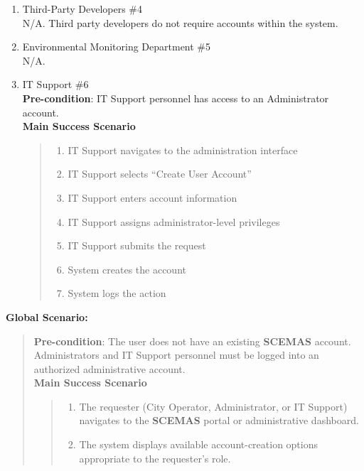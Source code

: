 \documentclass[]{article}
\begin{document}
\begin{enumerate}[{\bf BE9.}]
\begin{enumerate}[{\bf VP1.}]
			\item Third-Party Developers \#4\\
                N/A. Third party developers do not require accounts within the system.

			\item Environmental Monitoring Department \#5\\
                N/A.

			\item IT Support \#6\\
                \textbf{Pre-condition}: IT Support personnel has access to an Administrator account. \\
                \textbf{Main Success Scenario}
                \begin{quote}
                    \begin{enumerate}[1.]
                        \item IT Support navigates to the administration interface
                        \item IT Support selects ``Create User Account''
                        \item IT Support enters account information
                        \item IT Support assigns administrator-level privileges
                        \item IT Support submits the request
                        \item System creates the account
                        \item System logs the action
                    \end{enumerate}
                \end{quote}
		\end{enumerate}
    {\bf Global Scenario:}
        \begin{quote}
            \textbf{Pre-condition}: The user does not have an existing \textbf{SCEMAS} account. Administrators and IT Support personnel must be logged into an authorized administrative account. \\
            \textbf{Main Success Scenario}
            \begin{quote}
                \begin{enumerate}[1.]
                    \item The requester (City Operator, Administrator, or IT Support) navigates to the \textbf{SCEMAS} portal or administrative dashboard.
					\item The system displays available account-creation options appropriate to the requester's role.

\end{enumerate}
\end{quote}
\end{quote}
\end{enumerate}
\end{document}

